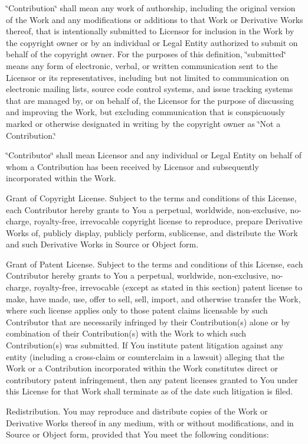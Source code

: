 \begin{DoxyEnumerate}
\char`\"{}\+Contribution\char`\"{} shall mean any work of authorship, including the original version of the Work and any modifications or additions to that Work or Derivative Works thereof, that is intentionally submitted to Licensor for inclusion in the Work by the copyright owner or by an individual or Legal Entity authorized to submit on behalf of the copyright owner. For the purposes of this definition, \char`\"{}submitted\char`\"{} means any form of electronic, verbal, or written communication sent to the Licensor or its representatives, including but not limited to communication on electronic mailing lists, source code control systems, and issue tracking systems that are managed by, or on behalf of, the Licensor for the purpose of discussing and improving the Work, but excluding communication that is conspicuously marked or otherwise designated in writing by the copyright owner as \char`\"{}\+Not a Contribution.\char`\"{}

\char`\"{}\+Contributor\char`\"{} shall mean Licensor and any individual or Legal Entity on behalf of whom a Contribution has been received by Licensor and subsequently incorporated within the Work.
\item Grant of Copyright License. Subject to the terms and conditions of this License, each Contributor hereby grants to You a perpetual, worldwide, non-\/exclusive, no-\/charge, royalty-\/free, irrevocable copyright license to reproduce, prepare Derivative Works of, publicly display, publicly perform, sublicense, and distribute the Work and such Derivative Works in Source or Object form.
\item Grant of Patent License. Subject to the terms and conditions of this License, each Contributor hereby grants to You a perpetual, worldwide, non-\/exclusive, no-\/charge, royalty-\/free, irrevocable (except as stated in this section) patent license to make, have made, use, offer to sell, sell, import, and otherwise transfer the Work, where such license applies only to those patent claims licensable by such Contributor that are necessarily infringed by their Contribution(s) alone or by combination of their Contribution(s) with the Work to which such Contribution(s) was submitted. If You institute patent litigation against any entity (including a cross-\/claim or counterclaim in a lawsuit) alleging that the Work or a Contribution incorporated within the Work constitutes direct or contributory patent infringement, then any patent licenses granted to You under this License for that Work shall terminate as of the date such litigation is filed.
\item Redistribution. You may reproduce and distribute copies of the Work or Derivative Works thereof in any medium, with or without modifications, and in Source or Object form, provided that You meet the following conditions\+:


\end{DoxyEnumerate}
